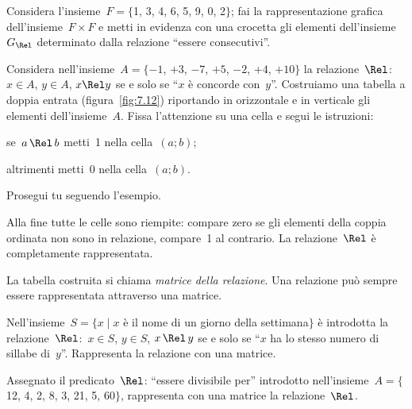 \begin{esercizio}
\label{ese:7.8}
Considera l'insieme~$F = \{$1, 3, 4, 6, 5, 9, 0, 2$\}$; fai la rappresentazione grafica dell'insieme~$F \times F$ e metti in evidenza con una crocetta gli
elementi dell'insieme~$G_\Rel$ determinato dalla relazione ``essere consecutivi''.
\end{esercizio}

\begin{esercizio}
\label{ese:7.9}
Considera nell'insieme~$A = \{-1$, $+3$, $-7$, $+5$, $-2$, $+4$, $+10\}$ la relazione~$\Rel$:~$x \in A$, $y \in A$, $x \Rel y$ se e solo se ``$x$
è concorde con~$y$''. Costruiamo una tabella a doppia entrata (figura~\ref{fig:7.12}) riportando in orizzontale e in verticale gli elementi dell'insieme~$A$.
Fissa l'attenzione su una cella e segui le istruzioni:
\begin{itemize*}
\item se~$a \,\Rel\, b$ metti~1 nella cella~$(a;b)$;
\item altrimenti metti~0 nella cella~$(a;b)$.
\end{itemize*}
Prosegui tu seguendo l'esempio.
\end{esercizio}

\osservazione Alla fine tutte le celle sono riempite: compare zero se gli elementi della coppia ordinata non sono in relazione, compare~1 al contrario.
La relazione~$\Rel$ è completamente rappresentata.

La tabella costruita si chiama \emph{matrice della relazione}.
Una relazione può sempre essere rappresentata attraverso una matrice.

\begin{esercizio}
\label{ese:7.10}
Nell'insieme~$S = \{ x \mid  x$ è il nome di un giorno della settimana$\}$ è introdotta la relazione~$\Rel$:~$x \in S$, $y \in S$, $x \,\Rel\, y$
se e solo se ``$x$ ha lo stesso numero di sillabe di~$y$''. Rappresenta la relazione con una matrice.
\end{esercizio}

\begin{esercizio}
\label{ese:7.11}
Assegnato il predicato~$\Rel$: ``essere divisibile per'' introdotto nell'insieme~$A =\{$12, 4, 2, 8, 3, 21, 5, 60$\}$, rappresenta con una matrice la relazione~$\Rel$.
\end{esercizio}

\begin{figure}[b]
\begin{minipage}[b]{.45\textwidth}
 \centering
 
 \caption{}\label{fig:7.12}
\end{minipage}\hfil
\begin{minipage}[b]{.45\textwidth}
 \centering
 
 \caption{}\label{fig:7.13}
\end{minipage}
\end{figure}

